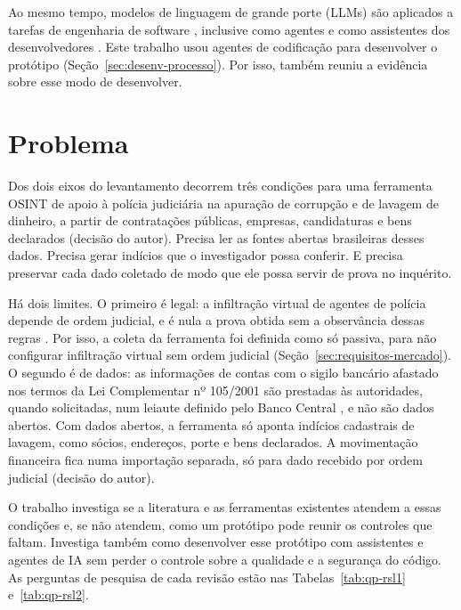 Ao mesmo tempo, modelos de linguagem de grande porte (LLMs) são aplicados a
tarefas de engenharia de software \cite{hou2024}, inclusive como agentes
\cite{liu2026} e como assistentes dos desenvolvedores \cite{mohamed2026}. Este trabalho
usou agentes de codificação para desenvolver o protótipo
(Seção~\ref{sec:desenv-processo}). Por isso, também reuniu a evidência sobre
esse modo de desenvolver.

\section{Problema}
\label{sec:intro-problema}

Dos dois eixos do levantamento decorrem três condições para uma ferramenta
OSINT de apoio à polícia judiciária na apuração de corrupção e de lavagem de
dinheiro, a partir de contratações públicas, empresas, candidaturas e bens
declarados (decisão do autor). Precisa ler as fontes abertas brasileiras
desses dados. Precisa gerar indícios que o investigador possa conferir. E
precisa preservar cada dado coletado de modo que ele possa servir de prova
no inquérito.

Há dois limites. O primeiro é legal: a infiltração virtual de agentes de
polícia depende de ordem judicial, e é nula a prova obtida sem a observância
dessas regras \cite[art. 10-A]{brasil2013lei12850}. Por isso, a coleta da
ferramenta foi definida como só passiva, para não configurar infiltração
virtual sem ordem judicial (Seção~\ref{sec:requisitos-mercado}). O segundo é
de dados: as informações de contas com o sigilo bancário afastado nos termos
da Lei Complementar nº 105/2001 são prestadas às autoridades, quando
solicitadas, num leiaute definido pelo Banco Central
\cite[art. 1º]{bcb2025in636}, e não são dados abertos. Com dados abertos, a
ferramenta só aponta indícios cadastrais de lavagem, como sócios, endereços,
porte e bens declarados. A movimentação financeira fica numa importação
separada, só para dado recebido por ordem judicial (decisão do autor).

O trabalho investiga se a literatura e as ferramentas existentes atendem a
essas condições e, se não atendem, como um protótipo pode reunir os controles
que faltam. Investiga também como desenvolver esse protótipo com assistentes
e agentes de IA sem perder o controle sobre a qualidade e a segurança do
código. As perguntas de pesquisa de cada revisão estão nas
Tabelas~\ref{tab:qp-rsl1} e~\ref{tab:qp-rsl2}.

